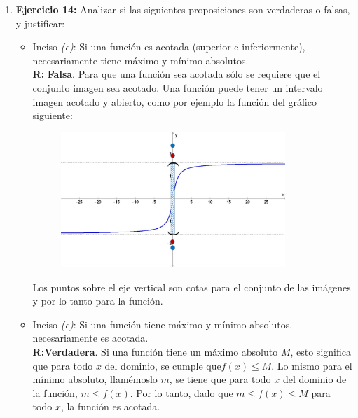 \documentclass[12pt]{article}
\theoremstyle{definition}
\begin{document}
\begin{enumerate}
\item \textbf{Ejercicio 14:} Analizar si las siguientes proposiciones son verdaderas o falsas, y justificar:
 \begin{itemize}
\setlength\itemsep{0em}
\item Inciso \textit{(c)}: Si una función es acotada (superior e inferiormente), necesariamente tiene máximo y mínimo absolutos.\\
\textbf{R:} \textbf{Falsa}. Para que una función sea acotada sólo se requiere que el conjunto imagen sea acotado. Una función puede tener un intervalo imagen acotado y abierto, como por ejemplo la función del gráfico siguiente:
\begin{figure}[H]
\centering
\includegraphics[width=0.85\textwidth]{14-1.png}
\end{figure}
Los puntos sobre el eje vertical son cotas para el conjunto de las imágenes y por lo tanto para la función.
\item Inciso \textit{(c)}: Si una función tiene máximo y mínimo absolutos, necesariamente es acotada.\\
\textbf{R:}\textbf{Verdadera}. Si una función tiene un máximo absoluto $M$, esto significa que para todo $x$ del dominio, se cumple que$f(x) \leq M$. Lo mismo para el mínimo absoluto, llamémoslo $m$, se tiene que para todo $x$ del dominio de la función, $m \leq f(x)$. Por lo tanto, dado que $m \leq f(x) \leq  M$ para todo $x$, la función es acotada.
\end{itemize}




\end{enumerate}
\end{document}
